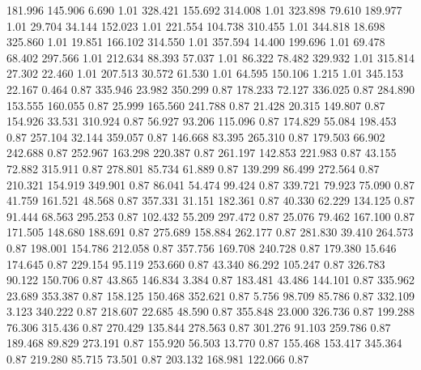  181.996  145.906    6.690         1.01
 328.421  155.692  314.008         1.01
 323.898   79.610  189.977         1.01
  29.704   34.144  152.023         1.01
 221.554  104.738  310.455         1.01
 344.818   18.698  325.860         1.01
  19.851  166.102  314.550         1.01
 357.594   14.400  199.696         1.01
  69.478   68.402  297.566         1.01
 212.634   88.393   57.037         1.01
  86.322   78.482  329.932         1.01
 315.814   27.302   22.460         1.01
 207.513   30.572   61.530         1.01
  64.595  150.106    1.215         1.01
 345.153   22.167    0.464         0.87
 335.946   23.982  350.299         0.87
 178.233   72.127  336.025         0.87
 284.890  153.555  160.055         0.87
  25.999  165.560  241.788         0.87
  21.428   20.315  149.807         0.87
 154.926   33.531  310.924         0.87
  56.927   93.206  115.096         0.87
 174.829   55.084  198.453         0.87
 257.104   32.144  359.057         0.87
 146.668   83.395  265.310         0.87
 179.503   66.902  242.688         0.87
 252.967  163.298  220.387         0.87
 261.197  142.853  221.983         0.87
  43.155   72.882  315.911         0.87
 278.801   85.734   61.889         0.87
 139.299   86.499  272.564         0.87
 210.321  154.919  349.901         0.87
  86.041   54.474   99.424         0.87
 339.721   79.923   75.090         0.87
  41.759  161.521   48.568         0.87
 357.331   31.151  182.361         0.87
  40.330   62.229  134.125         0.87
  91.444   68.563  295.253         0.87
 102.432   55.209  297.472         0.87
  25.076   79.462  167.100         0.87
 171.505  148.680  188.691         0.87
 275.689  158.884  262.177         0.87
 281.830   39.410  264.573         0.87
 198.001  154.786  212.058         0.87
 357.756  169.708  240.728         0.87
 179.380   15.646  174.645         0.87
 229.154   95.119  253.660         0.87
  43.340   86.292  105.247         0.87
 326.783   90.122  150.706         0.87
  43.865  146.834    3.384         0.87
 183.481   43.486  144.101         0.87
 335.962   23.689  353.387         0.87
 158.125  150.468  352.621         0.87
   5.756   98.709   85.786         0.87
 332.109    3.123  340.222         0.87
 218.607   22.685   48.590         0.87
 355.848   23.000  326.736         0.87
 199.288   76.306  315.436         0.87
 270.429  135.844  278.563         0.87
 301.276   91.103  259.786         0.87
 189.468   89.829  273.191         0.87
 155.920   56.503   13.770         0.87
 155.468  153.417  345.364         0.87
 219.280   85.715   73.501         0.87
 203.132  168.981  122.066         0.87
